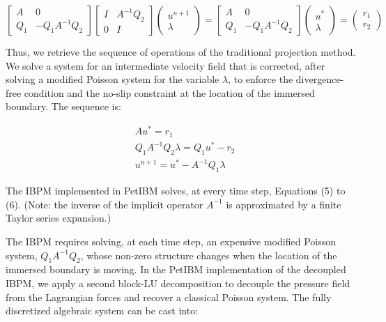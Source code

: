 \begin{equation}
\left[
\begin{matrix}
A & 0 \\
Q_1 & -Q_1A^{-1}Q_2
\end{matrix}
\right]
\left[
\begin{matrix}
I & A^{-1}Q_2 \\
0 & I
\end{matrix}
\right]
\left(
\begin{matrix}
u^{n+1} \\
\lambda
\end{matrix}
\right)
=
\left[
\begin{matrix}
A & 0 \\
Q_1 & -Q_1A^{-1}Q_2
\end{matrix}
\right]
\left(
\begin{matrix}
u^* \\
\lambda
\end{matrix}
\right)
=
\left(
\begin{matrix}
r_1 \\
r_2
\end{matrix}
\right)
\end{equation}

Thus, we retrieve the sequence of operations of the traditional projection method.
We solve a system for an intermediate velocity field that is corrected, after solving a modified Poisson system for the variable $\lambda$, to enforce the divergence-free condition and the no-slip constraint at the location of the immersed boundary.
The sequence is:

\begin{align}
& A u^* = r_1 \\
& Q_1A^{-1}Q_2 \lambda = Q_1 u^* - r_2 \\
& u^{n+1} = u^* - A^{-1}Q_1 \lambda
\end{align}

The IBPM implemented in PetIBM solves, at every time step, Equations (5) to (6).
(Note: the inverse of the implicit operator $A^{-1}$ is approximated by a finite Taylor series expansion.)


The IBPM requires solving, at each time step, an expensive modified Poisson system, $Q_1A^{-1}Q_2$, whose non-zero structure changes when the location of the immersed boundary is moving.
In the PetIBM implementation of the decoupled IBPM, we apply a second block-LU decomposition to decouple the pressure field from the Lagrangian forces and recover a classical Poisson system.
The fully discretized algebraic system can be cast into:


